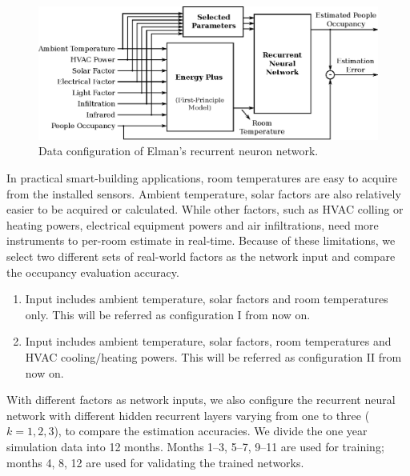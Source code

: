 \begin{figure}[t]
    \centering
    \includegraphics[width=0.9\columnwidth]{figs/rnn/data-flow.eps}
    \caption{Data configuration of Elman's recurrent neuron network.}
    \label{fig:data-flow}
\end{figure}

In practical smart-building applications, room temperatures are easy to acquire
from the installed sensors. Ambient temperature, solar factors are also
relatively easier to be acquired or calculated. While other factors, such as
HVAC colling or heating powers, electrical equipment powers and air
infiltrations, need more instruments to per-room estimate in real-time. Because
of these limitations, we select two different sets of real-world factors as the
network input and compare the occupancy evaluation accuracy.
\begin{enumerate}
    \item Input includes ambient temperature, solar factors and room
    temperatures only. This will be referred as configuration I from now on.

    \item Input includes ambient temperature, solar factors, room temperatures
    and HVAC cooling\slash{}heating powers. This will be referred as configuration II from now on.
\end{enumerate}
With different factors as network inputs, we also configure the recurrent
neural network with different hidden recurrent layers varying from one to
three ($k=1,2,3$), to compare the estimation accuracies. We divide the one year
simulation data into 12 months. Months 1--3, 5--7, 9--11 are used for training;
months 4, 8, 12 are used for validating the trained networks.

